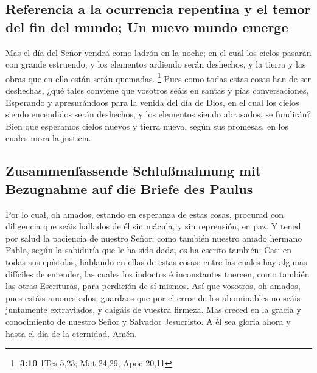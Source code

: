 \hypertarget{referencia-a-la-ocurrencia-repentina-y-el-temor-del-fin-del-mundo-un-nuevo-mundo-emerge}{%
\subsection{Referencia a la ocurrencia repentina y el temor del fin del
mundo; Un nuevo mundo
emerge}\label{referencia-a-la-ocurrencia-repentina-y-el-temor-del-fin-del-mundo-un-nuevo-mundo-emerge}}

 Mas el día del Señor vendrá como ladrón en la noche; en
el cual los cielos pasarán con grande estruendo, y los elementos
ardiendo serán deshechos, y la tierra y las obras que en ella están
serán quemadas. \footnote{\textbf{3:10} 1Tes 5,23; Mat 24,29; Apoc 20,11}
 Pues como todas estas cosas han de ser deshechas, ¿qué
tales conviene que vosotros seáis en santas y pías conversaciones,
 Esperando y apresurándoos para la venida del día de
Dios, en el cual los cielos siendo encendidos serán deshechos, y los
elementos siendo abrasados, se fundirán?  Bien que
esperamos cielos nuevos y tierra nueva, según sus promesas, en los
cuales mora la justicia.

\hypertarget{zusammenfassende-schluuxdfmahnung-mit-bezugnahme-auf-die-briefe-des-paulus}{%
\subsection{Zusammenfassende Schlußmahnung mit Bezugnahme auf die Briefe
des
Paulus}\label{zusammenfassende-schluuxdfmahnung-mit-bezugnahme-auf-die-briefe-des-paulus}}

 Por lo cual, oh amados, estando en esperanza de estas
cosas, procurad con diligencia que seáis hallados de él sin mácula, y
sin reprensión, en paz.  Y tened por salud la paciencia
de nuestro Señor; como también nuestro amado hermano Pablo, según la
sabiduría que le ha sido dada, os ha escrito también; 
Casi en todas sus epístolas, hablando en ellas de estas cosas; entre las
cuales hay algunas difíciles de entender, las cuales los indoctos é
inconstantes tuercen, como también las otras Escrituras, para perdición
de sí mismos.  Así que vosotros, oh amados, pues estáis
amonestados, guardaos que por el error de los abominables no seáis
juntamente extraviados, y caigáis de vuestra firmeza. 
Mas creced en la gracia y conocimiento de nuestro Señor y Salvador
Jesucristo. A él sea gloria ahora y hasta el día de la eternidad. Amén.
